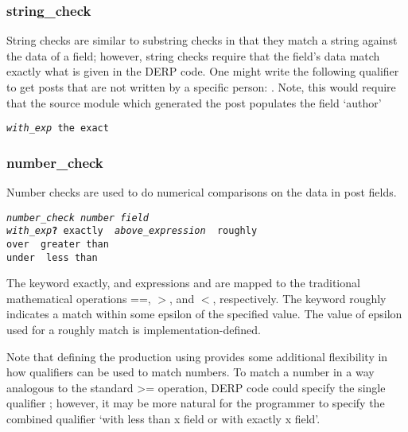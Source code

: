 \subsubsection{string\_check}
String checks are similar to substring checks in that they match a string against the data of a field; however, string checks require
that the field’s data match exactly what is given in the DERP code. One might write the following qualifier to get posts that are not
written by a specific person: . Note, this would require that the source module which
generated the post populates the field ‘author’
\begin{description}[labelindent=1cm,leftmargin=\onelen,labelwidth=1cm]
            
            \texttt{\textit{with\_exp} the exact}
\end{description}




\subsubsection{number\_check}
Number checks are used to do numerical comparisons on the data in post fields.
\begin{description}[labelindent=1cm,leftmargin=\onelen,labelwidth=1cm]
          \texttt{\textit{number\_check number field}}\\
          \texttt{\textit{with\_exp}\textbf{?} exactly \textbf{\textbar} \textit{above\_expression} \textbf{\textbar} roughly}\\
          \texttt{over \textbf{\textbar} greater than}\\
          \texttt{under \textbf{\textbar} less than}\\
\end{description}
The keyword exactly, and expressions  and  are mapped to the traditional mathematical operations ==, $>$, and $<$, respectively.
The keyword roughly indicates a match within some epsilon of the specified value. The value of epsilon used for a roughly match is implementation-defined.

Note that defining the  production using  provides some additional flexibility in how qualifiers can be used to match numbers. To match a
number in a way analogous to the standard >= operation, DERP code could specify the single qualifier ; however, it may be more natural
for the programmer to specify the combined qualifier ‘with less than x field or with exactly x field’.





